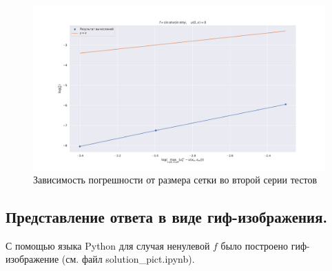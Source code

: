 \documentclass[14pt,a4paper]{extarticle}
\newcommand{\1}{\mathbbm{1}}
\begin{document}
\begin{figure}
    \centering
    \includegraphics[scale=0.4]{figs/OrderCon2.pdf}
    \caption{Зависимость погрешности от размера сетки во второй серии тестов}
    \label{t2}
\end{figure}

\subsection{Представление ответа в виде гиф-изображения.}
С помощью языка Python для случая ненулевой $f$ было построено гиф-изображение (см. файл solution\_pict.ipynb).

 
\end{document}

